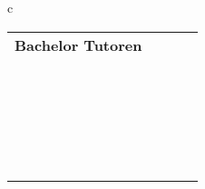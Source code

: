   \begin{tabular}{c}
\begin{tabular}{lll}
  { \textbf{Bachelor Tutoren}} \ \\ 
{
\picture[0.3\linewidth]
{bilder/tutoren/dominik_pass}
{Dominik\\%
\randomize{d.schuermann@tu-bs.de}}
}%
& \ 
{\picture[0.3\linewidth]
{bilder/tutoren/jan_germann.jpg}
{Jan\\%
\randomize{j.germann@tu-bs.de}}
} 
&\
{
\picture[0.3\linewidth]
{bilder/tutoren/hf}
{Hella\\%
\randomize{h-f.hoffmann@tu-bs.de}}}
\\ \  \\
{\picture[0.3\linewidth]
{bilder/tutoren/johannes.jpg}
{Johannes\\%
\randomize{J.Starosta@tu-bs.de}}
}& \ 

\end{tabular}
\end{tabular}

